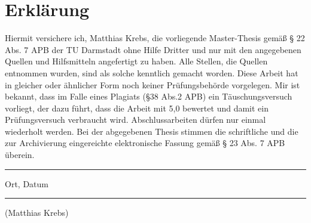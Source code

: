 \newpage
\thispagestyle{empty}
\section*{Erklärung}
Hiermit versichere ich, Matthias Krebs, die vorliegende Master-Thesis
gemäß § 22 Abs. 7 APB der TU Darmstadt ohne Hilfe Dritter und nur mit
den angegebenen Quellen und Hilfsmitteln angefertigt zu haben.
Alle Stellen, die Quellen entnommen wurden, sind als solche kenntlich
gemacht worden. Diese Arbeit hat in gleicher oder ähnlicher Form noch
keiner Prüfungsbehörde vorgelegen.
\newline\newline
Mir ist bekannt, dass im Falle eines Plagiats (§38 Abs.2 APB) ein
Täuschungsversuch vorliegt, der dazu führt, dass die Arbeit mit 5,0
bewertet und damit ein Prüfungsversuch verbraucht wird.
Abschlussarbeiten dürfen nur einmal wiederholt werden.
\newline\newline
Bei der abgegebenen Thesis stimmen die schriftliche und die zur
Archivierung eingereichte elektronische Fassung gemäß § 23 Abs. 7 APB überein.

\vskip 2cm
\parbox{4cm}{\centering\hrule
\strut \centering\footnotesize Ort, Datum} \hfill\parbox{4cm}{\hrule
\strut \centering\footnotesize (Matthias Krebs)}
\newpage

